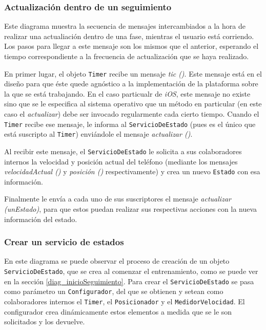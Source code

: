 \subsubsection{Actualización dentro de un seguimiento}

Este diagrama muestra la secuencia de mensajes intercambiados a la hora de realizar una actualiación dentro de una fase, mientras el usuario está corriendo. Los pasos para llegar a este mensaje son los mismos que el anterior, esperando el tiempo correspondiente a la frecuencia de actualización que se haya realizado.


En primer lugar, el objeto \texttt{Timer} recibe un mensaje \emph{tic ()}. Este mensaje está en el diseño para que éste quede agnóstico a la implementación de la plataforma sobre la que se está trabajando. En el caso particualr de \emph{iOS}, este mensaje no existe sino que se le especifica al sistema operativo que un método en particular (en este caso el \emph{actualizar}) debe ser invocado regularmente cada cierto tiempo. Cuando el \texttt{Timer} recibe ese mensaje, le informa al \texttt{ServicioDeEstado} (pues es el único que está suscripto al \texttt{Timer}) enviándole el mensaje \emph{actualizar ()}.


Al recibir este mensaje, el \texttt{ServicioDeEstado} le solicita a sus colaboradores internos la velocidad y posición actual del teléfono (mediante los mensajes \emph{velocidadActual ()} y \emph{posición ()} respectivamente) y crea un nuevo \texttt{Estado} con esa información.


Finalmente le envía a cada uno de sus suscriptores el mensaje \emph{actualizar (unEstado)}, para que estos puedan realizar sus respectivas acciones con la nueva información del estado. 

\subsubsection{Crear un servicio de estados}\label{diag_crearUnServicioDeEstado}

En este diagrama se puede observar el proceso de creación de un objeto \texttt{ServicioDeEstado}, que se crea al comenzar el entrenamiento, como se puede ver en la sección \ref{diag_inicioSeguimiento}. Para crear el \texttt{ServicioDeEstado}
 se pasa como parámetro un \texttt{Configurador}, del que se obtienen y setean como colaboradores internos el \texttt{Timer}, el \texttt{Posicionador} y el \texttt{MedidorVelocidad}. El configurador crea dinámicamente estos elementos a medida que se le son solicitados y los devuelve.

